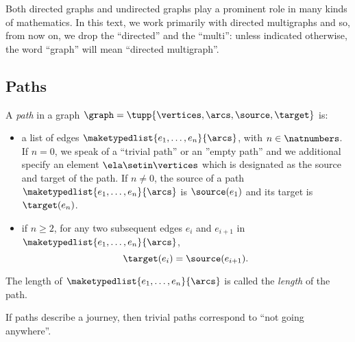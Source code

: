 
\begin{remark}
    Both directed graphs and undirected graphs play a prominent role in many kinds of mathematics.
    In this text, we work primarily with directed multigraphs and so, from now on, we drop the ``directed'' and the ``multi'': unless indicated otherwise, the word ``graph'' will mean ``directed multigraph''.

\end{remark}


\subsection{Paths}

\begin{definition}[Paths]
    \label{def:path}
    A \emph{path} in a graph $\graph=\tupp{\vertices,\arcs, \source,\target}$ is:
    
    \constit
    
    \begin{itemize}
    \item a list of edges $\maketypedlist{e_1, \dots, e_n}{\arcs}$, with $n \in \natnumbers$. If $n = 0$, we speak of a ``trivial path'' or an ''empty path'' and we additional specify an element $\ela \setin \vertices$ which is designated as the source and target of the path. If $n \neq 0$, the source of a path $\maketypedlist{e_1, \dots, e_n}{\arcs}$ is $\source(e_1)$ and its target is $\target(e_n)$.
    \end{itemize}

\condit

\begin{itemize}
    \item if $n \geq 2$, for any two subsequent edges $e_i$ and $e_{i+1}$ in $\maketypedlist{e_1, \dots, e_n}{\arcs}$, 
    \begin{equation}
\target(e_i) = \source(e_{i+1}).
\end{equation}
    \end{itemize} 
  The length of $\maketypedlist{e_1, \dots, e_n}{\arcs}$ is called the \emph{length} of the path. 
\end{definition}

\begin{remark} 
If paths describe a journey, then trivial paths correspond to ``not going anywhere''.
\end{remark}
